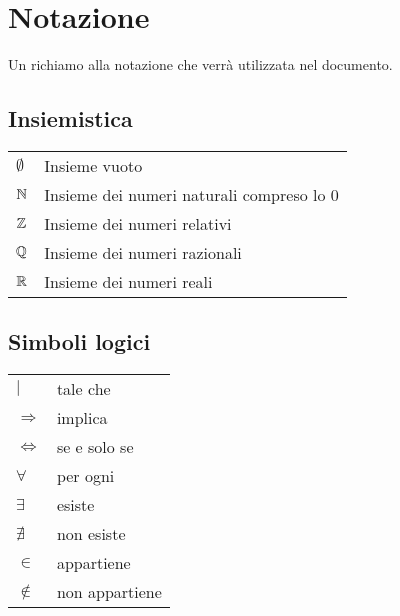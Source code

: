 
\chapter{Notazione} %

\label{ch:notazione} %

Un richiamo alla notazione che verrà utilizzata nel documento.

\section{Insiemistica}
\begin{tabular}{|l|l|}
  \hline
  $\emptyset$ & Insieme vuoto \\
  $\mathbb{N}$ & Insieme dei numeri naturali compreso lo $0$ \\
  $\mathbb{Z}$ & Insieme dei numeri relativi \\
  $\mathbb{Q}$ & Insieme dei numeri razionali \\
  $\mathbb{R}$ & Insieme dei numeri reali \\\hline
\end{tabular}

\section{Simboli logici}
\begin{tabular}{|l|l|}
  \hline
  $| $ & tale che \\
  $ \Rightarrow $ & implica \\
  $ \Leftrightarrow $ & se e solo se \\
  $ \forall $ & per ogni \\
  $ \exists $ & esiste \\
  $ \nexists $ & non esiste \\
  $ \in $ & appartiene \\
  $ \notin $ & non appartiene \\\hline
\end{tabular}



